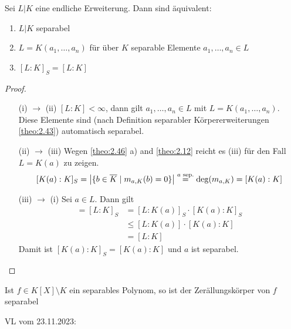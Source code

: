 \documentclass[../main.tex]{subfiles}
\begin{document}
\begin{theorem} \label{theo:2.47}
    Sei $L|K$ eine endliche Erweiterung. Dann sind äquivalent:
    \begin{enumerate}[label=(\roman*)]
        \item $L|K$ separabel
        \item $L=K(a_1, \dots, a_n)$ für über $K$ separable Elemente $a_1, \dots, a_n \in L$
        \item $[L:K]_S = [L:K]$
    \end{enumerate}
\end{theorem}
\begin{proof}
$ $
    \begin{itemize}[align= left]
        \item[(i) $\rightarrow$ (ii)] $[L:K] < \infty$, dann gilt $a_1, \dots, a_n \in L$ mit $L=K(a_1, \dots, a_n)$. Diese Elemente sind (nach Definition separabler Körpererweiterungen \cref{theo:2.43}) automatisch separabel.
        \item[(ii) $\rightarrow$ (iii)] Wegen \cref{theo:2.46} a) and \cref{theo:2.12} reicht es (iii) für den Fall $L=K(a)$ zu zeigen.
        $$[K(a):K]_S=\left\vert \{b\in \overline{K}\mid m_{a,K}(b)=0\} \right\vert \overset{a\text{ sep.}}{=}\deg(m_{a,K}) = [K(a):K]$$
        \item[(iii) $\rightarrow$ (i)] Sei $a\in L$. Dann gilt
        \begin{align*}
            [L:K] = [L:K]_S &= [L:K(a)]_S \cdot [K(a):K]_S\\
            &\leq [L:K(a)] \cdot [K(a):K]\\
            &= [L:K]
        \end{align*}
        Damit ist $[K(a):K]_S = [K(a):K]$ und $a$ ist separabel.
    \end{itemize}
\end{proof}
\begin{corollary}
    Ist $f\in K[X]\setminus K$ ein separables Polynom, so ist der Zerällungskörper von $f$ separabel
\end{corollary}


\begin{flushright}
VL vom 23.11.2023:
\end{flushright}
\end{document}
